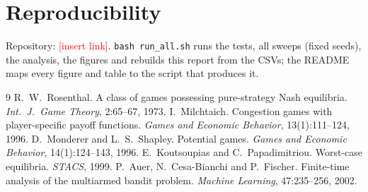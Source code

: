 \documentclass[11pt]{article}
\newcommand{\confirm}[1]{\textcolor{red}{#1}}
\begin{document}
\section{Reproducibility}\label{sec:repro}
Repository: \confirm{[insert link]}. \texttt{bash run\_all.sh} runs the tests, all sweeps (fixed seeds), the analysis, the figures and rebuilds this report from the CSVs; the README maps every figure and table to the script that produces it.
\begin{thebibliography}{9}\footnotesize
{} R.~W.~Rosenthal. A class of games possessing pure-strategy Nash equilibria. \emph{Int.\ J.\ Game Theory}, 2:65--67, 1973.
 I.~Milchtaich. Congestion games with player-specific payoff functions. \emph{Games and Economic Behavior}, 13(1):111--124, 1996.
 D.~Monderer and L.~S.~Shapley. Potential games. \emph{Games and Economic Behavior}, 14(1):124--143, 1996.
 E.~Koutsoupias and C.~Papadimitriou. Worst-case equilibria. \emph{STACS}, 1999.
 P.~Auer, N.~Cesa-Bianchi and P.~Fischer. Finite-time analysis of the multiarmed bandit problem. \emph{Machine Learning}, 47:235--256, 2002.
\end{thebibliography}
\end{document}
